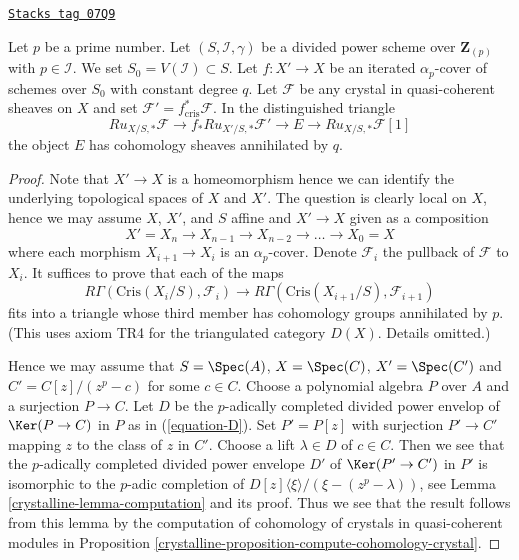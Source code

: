 \begin{lemma}
\label{crystalline-lemma-pullback-along-p-power-cover}
\href{https://stacks.math.columbia.edu/tag/07Q9}{\texttt{Stacks tag 07Q9}}

Let $p$ be a prime number. Let $(S, \mathcal{I}, \gamma)$ be a divided power
scheme over $\mathbf{Z}_{(p)}$ with $p \in \mathcal{I}$. We set
$S_0 = V(\mathcal{I}) \subset S$. Let $f : X' \to X$ be an iterated
$\alpha_p$-cover of schemes over $S_0$ with constant degree $q$. Let
$\mathcal{F}$ be any crystal in quasi-coherent sheaves on $X$ and set
$\mathcal{F}' = f_{\text{cris}}^*\mathcal{F}$.
In the distinguished triangle
$$
Ru_{X/S, *}\mathcal{F}
\longrightarrow
f_*Ru_{X'/S, *}\mathcal{F}'
\longrightarrow
E
\longrightarrow
Ru_{X/S, *}\mathcal{F}[1]
$$
the object $E$ has cohomology sheaves annihilated by $q$.
\end{lemma}

\begin{proof}

Note that $X' \to X$ is a homeomorphism hence we can identify the underlying
topological spaces of $X$ and $X'$. The question is clearly local on $X$,
hence we may assume $X$, $X'$, and $S$ affine and $X' \to X$ given as a
composition
$$
X' = X_n \to X_{n - 1} \to X_{n - 2} \to \ldots \to X_0 = X
$$
where each morphism $X_{i + 1} \to X_i$ is an $\alpha_p$-cover.
Denote $\mathcal{F}_i$ the pullback of $\mathcal{F}$ to $X_i$.
It suffices to prove that each of the maps
$$
R\Gamma(\text{Cris}(X_i/S), \mathcal{F}_i)
\longrightarrow
R\Gamma(\text{Cris}(X_{i + 1}/S), \mathcal{F}_{i + 1})
$$
fits into a triangle whose third member has cohomology groups annihilated
by $p$. (This uses axiom TR4 for the triangulated category $D(X)$. Details
omitted.)

\medskip\noindent
Hence we may assume that $S = \Spec(A)$, $X = \Spec(C)$, $X' = \Spec(C')$
and $C' = C[z]/(z^p - c)$ for some $c \in C$. Choose a polynomial algebra
$P$ over $A$ and a surjection $P \to C$. Let $D$ be the $p$-adically completed
divided power envelop of $\Ker(P \to C)$ in $P$ as in (\ref{equation-D}).
Set $P' = P[z]$ with surjection $P' \to C'$ mapping $z$ to the class of $z$
in $C'$. Choose a lift $\lambda \in D$ of $c \in C$. Then we see that
the $p$-adically completed divided power envelope $D'$ of
$\Ker(P' \to C')$ in $P'$ is isomorphic to the $p$-adic completion of
$D[z]\langle \xi \rangle/(\xi - (z^p - \lambda))$, see
Lemma \ref{crystalline-lemma-computation} and its proof.
Thus we see that the result follows from this lemma
by the computation of cohomology of crystals in quasi-coherent modules in
Proposition \ref{crystalline-proposition-compute-cohomology-crystal}.
\end{proof}

